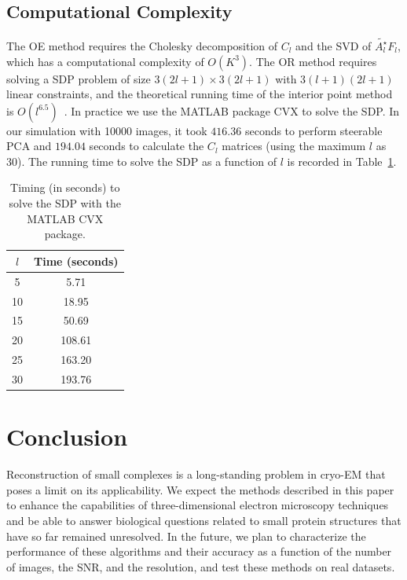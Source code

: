 \documentclass{article}
\begin{document}
\subsection{Computational Complexity}
The OE method requires the Cholesky decomposition of $C_l$ and the SVD of $\tilde{A_l^\star}F_l$, which has a computational complexity of $O(K^3)$.
The OR method requires solving a SDP problem of size $3(2l+1)\times 3(2l+1)$ with $3(l+1)(2l+1)$ linear constraints, and the theoretical running time of the interior point method is $O(l^{6.5})$~\cite[Section 4.6.3]{ben2001lectures}. In practice we use the MATLAB package CVX to solve the SDP. In our simulation with 10000 images, it took $416.36$ seconds to perform steerable PCA and $194.04$ seconds to calculate the $C_l$ matrices (using the maximum $l$ as 30). The running time to solve the SDP as a function of $l$ is recorded in Table~\ref{table:timing}.
\begin{table}[h!]
\vspace{-.05in}
\begin{center}
\begin{tabular}{|c|c|}
\hline
$l$  & Time (seconds)  \\
\hline
5 & 5.71  \\
\hline
10 & 18.95 \\
\hline
15 & 50.69 \\
\hline
20 & 108.61  \\
\hline
25 & 163.20  \\
\hline
30 & 193.76   \\
\hline
\end{tabular}
\end{center}
\vspace{-.1in}
\caption{Timing (in seconds) to solve the SDP with the MATLAB CVX package.}
\label{table:timing}
\end{table}
\vspace{-.15in}
\section{Conclusion}
Reconstruction of small complexes is a long-standing problem in cryo-EM that poses a limit on its applicability.
We expect the methods described in this paper to enhance the capabilities of three-dimensional electron microscopy techniques
and be able to answer biological questions related to small protein structures that have so far remained unresolved.
In the future, we plan to characterize the performance of these
algorithms and their accuracy as a function of the number of images, the SNR, and the resolution, and test these methods on real datasets.




\end{document}
